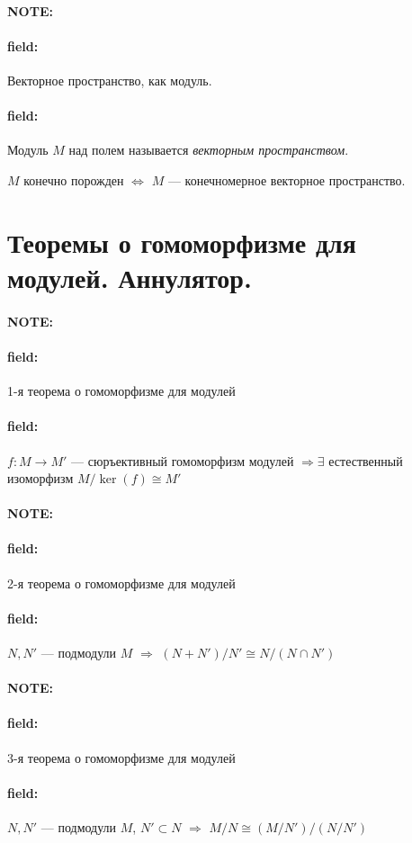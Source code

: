 \documentclass[12pt]{article}
\newenvironment{note}{\paragraph{NOTE:}}{}
\newenvironment{field}{\paragraph{field:}}{}
\begin{document}

\begin{note}
  \begin{field}
    Векторное пространство, как модуль.
  \end{field}
  \begin{field}
    Модуль $M$ над полем называется \emph{векторным пространством}.

    $M$ конечно порожден $\Leftrightarrow$
    $M$ --- конечномерное векторное пространство.
  \end{field}
\end{note}

\section{Теоремы о гомоморфизме для модулей. Аннулятор.}

\begin{note}
  \begin{field}
    1-я теорема о гомоморфизме для модулей
  \end{field}
  \begin{field}
    $f : M \rightarrow M'$ --- сюръективный гомоморфизм модулей
    $\Rightarrow \exists$ естественный изоморфизм
    $M/ \ker(f) \cong M'$
  \end{field}
\end{note}

\begin{note}
  \begin{field}
    2-я теорема о гомоморфизме для модулей
  \end{field}
  \begin{field}
    $N, N'$ --- подмодули $M$
    $\Rightarrow$
    $(N + N')/N' \cong N/(N \cap N')$
  \end{field}
\end{note}

\begin{note}
  \begin{field}
    3-я теорема о гомоморфизме для модулей
  \end{field}
  \begin{field}
    $N, N'$ --- подмодули $M$,
    $N' \subset N$
    $\Rightarrow$
    $M/N \cong (M/N')/(N/N')$
  \end{field}
\end{note}
\end{document}
